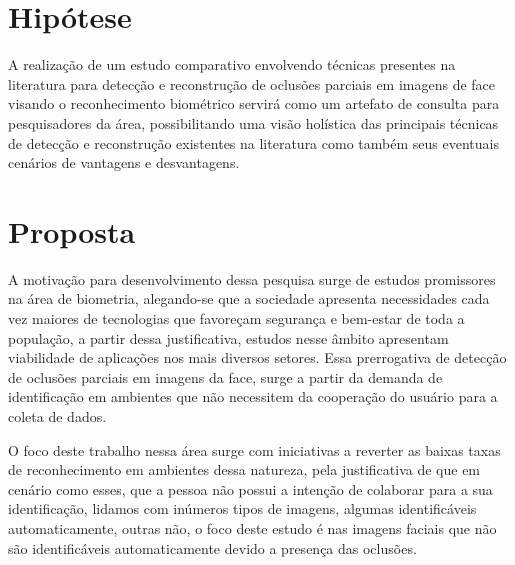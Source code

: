 \section{Hipótese}
A realização de um estudo comparativo envolvendo técnicas presentes na literatura para detecção e reconstrução de oclusões parciais em imagens de face visando o reconhecimento biométrico servirá como um artefato de consulta para pesquisadores da área, possibilitando uma visão holística das principais técnicas de detecção e reconstrução existentes na literatura como também seus eventuais cenários de vantagens e desvantagens.


\section{Proposta}

A motivação para desenvolvimento dessa pesquisa surge de estudos promissores na área de biometria, alegando-se que a sociedade apresenta necessidades cada vez maiores de tecnologias que favoreçam segurança e bem-estar de toda a população, a partir dessa justificativa, estudos nesse âmbito apresentam viabilidade de aplicações nos mais diversos setores. Essa prerrogativa de detecção de oclusões parciais em imagens da face, surge a partir da demanda de identificação em ambientes que não necessitem da cooperação do usuário para a coleta de dados.%

O foco deste trabalho nessa área surge com iniciativas a reverter as baixas taxas de reconhecimento em ambientes dessa natureza, pela justificativa de que em cenário como esses, que a pessoa não possui a intenção de colaborar para a sua identificação, lidamos com inúmeros tipos de imagens, algumas identificáveis automaticamente, outras não, o foco deste estudo é nas imagens faciais que não são identificáveis automaticamente devido a presença das oclusões.

